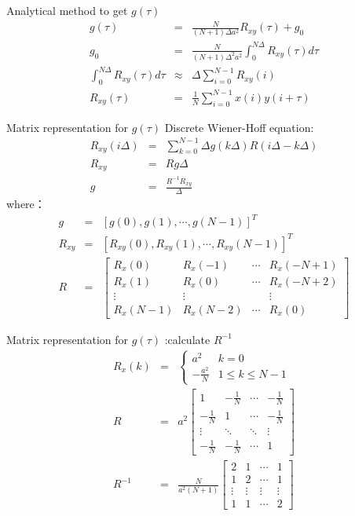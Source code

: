 \begin{frame}{Analytical method to get $g(\tau)$}
\begin{eqnarray*}
g(\tau)&=&\frac{N}{(N+1)\Delta a^2}R_{xy}(\tau) +g_0\\
g_0 &=& \frac{N}{(N+1)\Delta^2 a^2}\int_0^{N\Delta}R_{xy}(\tau)d\tau \\
\int_0^{N\Delta}R_{xy}(\tau)d\tau &\approx & \Delta\sum_{i=0}^{N-1}R_{xy}(i) \\
R_{xy}(\tau) &=& \frac{1}{N}\sum_{i=0}^{N-1}x(i)y(i+\tau)
\end{eqnarray*}
\end{frame}

\begin{frame}{Matrix representation for $g(\tau)$}
Discrete Wiener-Hoff equation:
\begin{eqnarray*}
R_{xy}(i\Delta) &=& \sum_{k=0}^{N-1}\Delta g(k\Delta)R(i\Delta-k\Delta) \\
R_{xy} &=& R g\Delta  \\
g&=& \frac{R^{-1} R_{xy}}{ \Delta }
\end{eqnarray*}
where：
\begin{eqnarray*}
g &=& [g(0),g(1),\cdots,g(N-1)]^T \\
R_{xy} &=& [R_{xy}(0),R_{xy}(1),\cdots,R_{xy}(N-1)]^T \\
R &=&
\begin{bmatrix}
R_x(0) & R_x(-1)  & \cdots & R_x(-N+1)  \\
R_x(1) & R_x(0)   & \cdots & R_x(-N+2)  \\
\vdots & \vdots   &        & \vdots     \\
R_x(N-1) & R_x(N-2)   & \cdots & R_x(0)  
\end{bmatrix}
\end{eqnarray*}
\end{frame}

\begin{frame}{Matrix representation for $g(\tau)$ :calculate $R^{-1}$ }
\begin{eqnarray*}
R_x(k) &=&
\begin{cases}
a^2 & k=0  \\
-\frac{a^2}{N}  & 1\leq k \leq N-1
\end{cases} \\
R &=& a^2
\begin{bmatrix}
1 & -\frac{1}{N} & \cdots & -\frac{1}{N}  \\
-\frac{1}{N} & 1 & \cdots & -\frac{1}{N}  \\
\vdots & \ddots  & \ddots & \vdots \\
-\frac{1}{N} & -\frac{1}{N} & \cdots & 1 
\end{bmatrix} \\
R^{-1} &=& \frac{N}{a^2(N+1)}
\begin{bmatrix}
2 & 1 & \cdots & 1 \\
1 & 2 & \cdots & 1 \\
\vdots & \vdots & \vdots & \vdots \\
1 & 1 & \cdots  & 2
\end{bmatrix}
\end{eqnarray*}
\end{frame}

